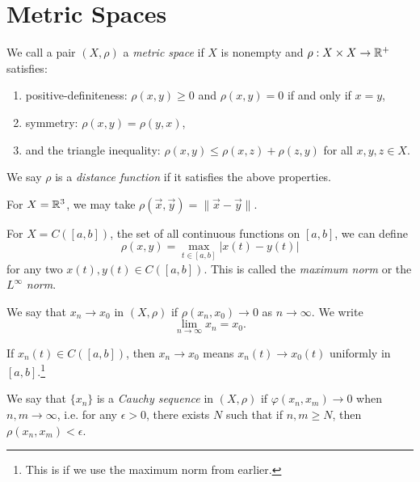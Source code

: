\section{Metric Spaces}

\begin{definition}
  We call a pair $(X, \rho)$ a \emph{metric space} if
  $X$ is nonempty and
  $\rho : X \times X \to \mathbb{R}^+$
  satisfies:
  \begin{enumerate}
    \item positive-definiteness: $\rho(x, y) \ge 0$ and $\rho(x, y) = 0$
      if and only if $x = y$,
    \item symmetry: $\rho(x, y) = \rho(y, x)$,
    \item and the triangle inequality: $\rho(x, y) \le \rho(x, z) + \rho(z, y)$ for
      all $x, y, z \in X$.
  \end{enumerate}
  We say $\rho$ is a \emph{distance function} if it
  satisfies the above properties.
\end{definition}

\begin{example}
  For $X = \mathbb{R}^3$, we may take
  $\rho(\vec{x}, \vec{y}) = \|\vec{x} - \vec{y}\|$.
\end{example}

\begin{example}
  For $X = C([a, b])$, the set of all
  continuous functions on $[a, b]$, we can define
  \[
    \rho(x, y) = \max_{t \in [a, b]} |x(t) - y(t)|
  \]
  for any two $x(t), y(t) \in C([a, b])$.
  This is called the \emph{maximum norm} or
  the $L^\infty$ \emph{norm}.
\end{example}

\begin{definition}[Convergence]
  We say that $x_n \to x_0$ in $(X, \rho)$ if
  $\rho(x_n, x_0) \to 0$ as $n \to \infty$. We write
  \[
    \lim_{n \to \infty} x_n = x_0.
  \]
\end{definition}

\begin{example}
  If $x_n(t) \in C([a, b])$, then $x_n \to x_0$
  means $x_n(t) \to x_0(t)$ uniformly in $[a, b]$.\footnote{This is if we use the maximum norm from earlier.}
\end{example}

\begin{definition}
  We say that $\{x_n\}$ is a \emph{Cauchy sequence} in
  $(X, \rho)$ if $\varphi(x_n, x_m) \to 0$
  when $n, m \to \infty$, i.e. for any $\epsilon > 0$,
  there exists $N$ such that if $n, m \ge N$, then
  $\rho(x_n, x_m) < \epsilon$.
\end{definition}

